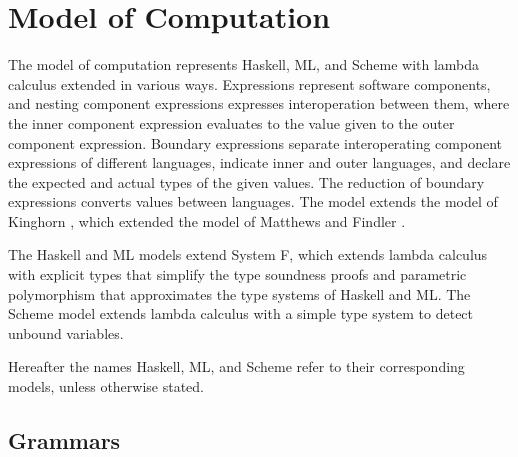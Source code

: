 \chapter{Model of Computation}

The model of computation represents Haskell, ML, and Scheme with lambda calculus extended in various ways.  Expressions represent software components, and nesting component expressions expresses interoperation between them, where the inner component expression evaluates to the value given to the outer component expression.  Boundary expressions separate interoperating component expressions of different languages, indicate inner and outer languages, and declare the expected and actual types of the given values.  The reduction of boundary expressions converts values between languages.  The model extends the model of Kinghorn \cite{kinghorn07}, which extended the model of Matthews and Findler \cite{matthews07}.

The Haskell and ML models extend System F, which extends lambda calculus with explicit types that simplify the type soundness proofs and parametric polymorphism that approximates the type systems of Haskell and ML.  The Scheme model extends lambda calculus with a simple type system to detect unbound variables.

Hereafter the names Haskell, ML, and Scheme refer to their corresponding models, unless otherwise stated.

\section{Grammars}

